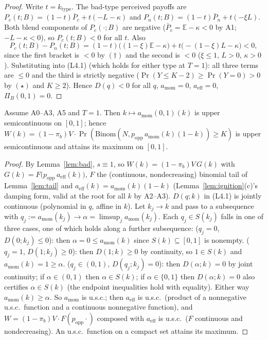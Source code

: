\begin{proof}
Write $t=k_{\mathrm{type}}$. The bad-type perceived payoffs are
$P_c(t;B)=(1-t)\bar P_c+t(-L-\kappa)$ and $P_n(t;B)=(1-t)\bar P_n+t(-\xi L)$. Both blend
components of $P_c(\cdot;B)$ are negative ($\bar P_c=\mathbb E-\kappa<0$ by A1;
$-L-\kappa<0$), so $P_c(t;B)<0$ for all $t$. Also
\[
P_c(t;B)-P_n(t;B)=(1-t)\big((1-\xi)\mathbb E-\kappa\big)+t\big(-(1-\xi)L-\kappa\big)<0,
\]
since the first bracket is $<0$ by $(\dagger)$ and the second is $<0$ ($\xi\le 1$, $L>0$,
$\kappa>0$). Substituting into (L4.1) (which holds for either type at $T=1$): all three terms
are $\le 0$ and the third is strictly negative ($\Pr(Y\le K-2)\ge\Pr(Y=0)>0$ by $(\star)$ and
$K\ge 2$). Hence $D(q)<0$ for all $q$, $a_{\mathrm{mom}}=0$, $a_{\mathrm{eff}}=0$,
$\Pi_B(0,1)=0$.
\end{proof}

\begin{lemma}[upper semicontinuity and attainment, $T=1$, bundled]\label{lem:usc}
Assume A0--A3, A5 and $T=1$. Then $k\mapsto a_{\mathrm{mom}}(0,1)(k)$ is upper semicontinuous
on $[0,1]$; hence
$W(k)=(1-\pi_b)V\cdot\Pr(\mathrm{Binom}(N,p_{\mathrm{opp}}\,a_{\mathrm{mom}}(k)(1-k))\ge K)$
is upper semicontinuous and attains its maximum on $[0,1]$.
\end{lemma}

\begin{proof}
By Lemma~\ref{lem:bad}, $s\equiv 1$, so $W(k)=(1-\pi_b)V\,G(k)$ with
$G(k)=F\big(p_{\mathrm{opp}}\,a_{\mathrm{eff}}(k)\big)$, $F$ the (continuous, nondecreasing)
binomial tail of Lemma~\ref{lem:tail} and $a_{\mathrm{eff}}(k)=a_{\mathrm{mom}}(k)(1-k)$
(Lemma~\ref{lem:ignition}(c)'s damping form, valid at the root for all $k$ by A2--A3).
$D(q;k)$ in (L4.1) is jointly continuous (polynomial in $q$, affine in $k$). Let $k_j\to k$
and pass to a subsequence with
$q_j:=a_{\mathrm{mom}}(k_j)\to\alpha=\limsup_j a_{\mathrm{mom}}(k_j)$. Each $q_j\in S(k_j)$
falls in one of three cases, one of which holds along a further subsequence: ($q_j=0$,
$D(0;k_j)\le 0$): then $\alpha=0\le a_{\mathrm{mom}}(k)$ since $S(k)\subseteq[0,1]$ is
nonempty. ($q_j=1$, $D(1;k_j)\ge 0$): then $D(1;k)\ge 0$ by continuity, so $1\in S(k)$ and
$a_{\mathrm{mom}}(k)=1\ge\alpha$. ($q_j\in(0,1)$, $D(q_j;k_j)=0$): then $D(\alpha;k)=0$ by
joint continuity; if $\alpha\in(0,1)$ then $\alpha\in S(k)$; if $\alpha\in\{0,1\}$ then
$D(\alpha;k)=0$ also certifies $\alpha\in S(k)$ (the endpoint inequalities hold with
equality). Either way $a_{\mathrm{mom}}(k)\ge\alpha$. So $a_{\mathrm{mom}}$ is u.s.c.; then
$a_{\mathrm{eff}}$ is u.s.c.\ (product of a nonnegative u.s.c.\ function and a continuous
nonnegative function), and $W=(1-\pi_b)V\cdot F(p_{\mathrm{opp}}\cdot)$ composed with
$a_{\mathrm{eff}}$ is u.s.c.\ ($F$ continuous and nondecreasing). An u.s.c.\ function on a
compact set attains its maximum.
\end{proof}

